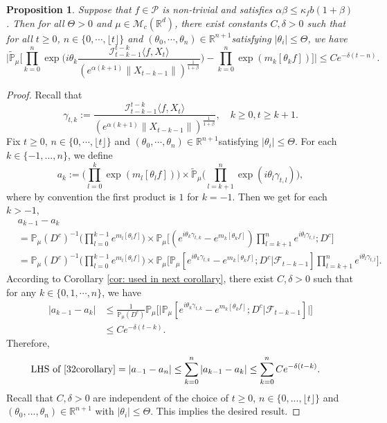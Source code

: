 \documentclass[12pt,a4paper]{amsart}
\theoremstyle{plain}
\newtheorem{prop}[thm]{Proposition}
\theoremstyle{definition}
\numberwithin{equation}{section}
\begin{document}
\begin{prop}\label{cor: indepedent of the limit zeta for critical and small}
   Suppose that $f\in \mathcal{P}$ is non-trivial and satisfies $\alpha\beta\leq\kappa_fb(1+\beta)$.
    Then for all $\Theta >0$ and $\mu\in \mathcal M_c(\mathbb R^d)$, there exist constants $C,\delta>0$ such that for all $t\geq 0$, $n \in \{0, \cdots, \lfloor t \rfloor\}$ and $(\theta_0, \cdots, \theta_n)\in \mathbb R^{n+1}$satisfying $|\theta_i|\leq \Theta$, we have
\begin{equation}
\label{32corollary}
    \Big|\mathbb{\widetilde{P}}_{\mu}\Big[\prod_{k=0}^n\exp\Big(i\theta_k \frac {\mathcal I_{t-k-1}^{t-k}\langle f ,X_t\rangle}{(e^{\alpha (k+1)}\|X_{t-k-1}\|)^\frac{1}{1+\beta}}\Big)-\prod_{k=0}^n\exp(m_k[\theta_k f])\Big]\Big|\leq C e^{-\delta(t-n)}.
\end{equation}
\end{prop}
\begin{proof}
    Recall that \[\gamma_{t,k}:=\frac {\mathcal I_{t-k-1}^{t-k}\langle f ,X_t\rangle}{(e^{\alpha( k+1)}\|X_{t-k-1}\|)^\frac{1}{1+\beta}},\quad k \geq 0, t\geq k+1. \]
    Fix $t\geq 0$, $n \in \{0, \cdots, \lfloor t \rfloor\}$ and $(\theta_0, \cdots, \theta_n)\in \mathbb R^{n+1}$satisfying $|\theta_i|\leq \Theta$.
    For each $k\in\{-1,...,n\}$, we define
\[
    a_k
    :=\Big(\prod_{l=0}^{k}\exp(m_l[\theta_lf])\Big) \times \mathbb{\widetilde{P}}_{\mu}\Big(\prod_{l=k+1}^{n}\exp\left(i\theta_l\gamma_{t,l}\right)\Big),
\]
    where by convention the first product is $1$ for $k=-1$. Then we get for each $k > -1$,
\begin{align}
    &a_{k-1} - a_k
    \\&=\mathbb{P}_{\mu}(D^c)^{-1}\Big(\prod_{l=0}^{k-1}e^{m_l[\theta_l f]}\Big) \times \mathbb{P}_{\mu}\Big[(e^{i\theta_{k}\gamma_{t,k}}-e^{m_k[\theta_k f]})\prod_{l=k+1}^ne^{i\theta_{l}\gamma_{t,l}};D^c\Big]
    \\&=\mathbb{P}_{\mu}(D^c)^{-1} \Big(\prod_{l=0}^{k-1}e^{m_l[\theta_l f]}\Big) \times \mathbb{P}_{\mu}\Big[\mathbb P_\mu[e^{i\theta_{k}\gamma_{t,k}}-e^{m_k[\theta_k f]}; D^c|\mathscr F_{t-k-1}]\prod_{l=k+1}^ne^{i\theta_{l}\gamma_{t,l}}\Big].
\end{align}
    According to Corollary \ref{cor: used in next corollary}, there exist $C,\delta>0$ such that for any $k\in\{0, 1, \cdots, n\}$, we have
\begin{align}
    |a_{k-1}- a_k|
    &\leq \frac{1}{\mathbb{P}_{\mu}(D^c)}\mathbb{P}_{\mu}\Big[\big|\mathbb P_\mu[e^{i\theta_{k}\gamma_{t,k}}-e^{m_k[\theta_k f]}; D^c\big|\mathscr{F}_{t-k-1}]\big|\Big]
    \\& \leq C e^{-\delta(t-k)}.
\end{align}
    Therefore,
\begin{align}
    \text{LHS of \eqref{32corollary}}&= \left|a_{-1}-a_n\right|
    \leq\sum_{k=0}^n\left|a_{k-1}-a_k\right|
    \leq \sum_{k=0}^n C e^{-\delta(t-k)}.
\end{align}
	Recall that $C, \delta>0$ are independent of the choice of $t\geq 0$, $n \in \{0,...,\lfloor t \rfloor\}$ and $(\theta_0,...,\theta_n)\in \mathbb R^{n+1}$ with $|\theta_i|\leq \Theta$.
    This implies the desired result.
\end{proof}
\end{document}

